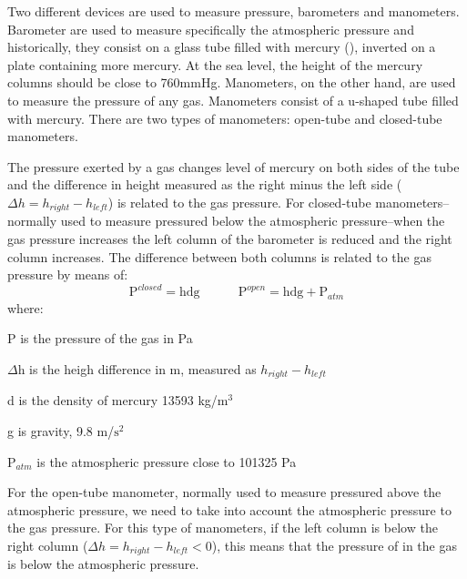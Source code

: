 \documentclass[main.tex]{subfiles}
\newcommand\chapterlabel{Ch-Gas}\setcounter{figurenewcounter}{0}\setcounter{tablenewcounter}{0}\setcounter{formulanewcounter}{0}
\begin{document}
\begin{description}
\begin{minipage}[b]{1.0\linewidth}
\end{minipage}
\item[\docfilehook{Measuring pressure}{Measuring pressure}] 
Two different devices are used to measure pressure, barometers and manometers. Barometer are used to measure specifically the atmospheric pressure and historically, they consist on a glass tube filled with mercury (), inverted on a plate containing more mercury. At the sea level, the height of the mercury columns should be close to 760mmHg.
Manometers, on the other hand, are used to measure the pressure of any gas. Manometers consist of a u-shaped tube filled with mercury. There are two types of manometers: open-tube and closed-tube manometers.





The pressure exerted by a gas changes level of mercury on both sides of the tube and the difference in height measured as the right minus the left side ($\Delta h=h_{right}-h_{left}$) is related to the gas pressure. For closed-tube manometers--normally used to measure pressured below the atmospheric pressure--when the gas pressure increases the left column of the barometer is reduced and the right column increases. The difference between both columns is related to the gas pressure by means of:
\begin{equation}
\boxed{   \text{P}^{closed}=\text{hdg}} \quad\quad\quad  \boxed{ \text{P}^{open}=\text{hdg}+\text{P}_{atm}}    
\end{equation}
where:
\begin{where}
 \item P   is the pressure of the gas in Pa
\item $\Delta$h is the heigh difference in m, measured as $h_{right}-h_{left}$
 \item d   is the density of mercury 13593 kg/$\text{m}^3$
\item g   is gravity, 9.8 m/$\text{s}^2$
\item $\text{P}_{atm}$   is the atmospheric pressure close to 101325 Pa
\end{where}

For the open-tube manometer, normally used to measure pressured above the atmospheric pressure, we need to take into account the atmospheric pressure to the gas pressure. For this type of manometers, if the left column is below the right column ($\Delta h=h_{right}-h_{left}<0$), this means that the pressure of in the gas is below the atmospheric pressure.




\end{description}
\end{document}
